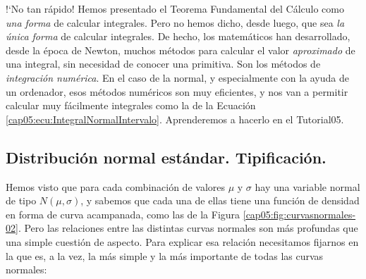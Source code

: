 {!`}No tan rápido! Hemos presentado el Teorema Fundamental del Cálculo como {\em una forma} de calcular integrales. Pero no hemos dicho, desde luego, que sea {\em la única forma} de calcular integrales. De hecho, los matemáticos han desarrollado, desde la época de Newton, muchos métodos para calcular el valor {\em aproximado} de una integral, sin necesidad de conocer una primitiva. Son los métodos de {\em integración numérica}. En el caso de la normal, y especialmente con la  ayuda de un ordenador, esos métodos numéricos son muy eficientes, y nos van a permitir calcular muy fácilmente integrales como la de la Ecuación \ref{cap05:ecu:IntegralNormalIntervalo}. Aprenderemos a hacerlo en el Tutorial05.


\subsection{Distribución normal estándar. Tipificación.}
\label{cap05:subsec:DistribucionNormalEstandarTipificacion}

Hemos visto que para cada combinación de valores $\mu$ y $\sigma$ hay una variable normal de tipo
$N(\mu,\sigma)$, y sabemos que cada una de ellas tiene una función de densidad en forma de curva
acampanada, como las de la Figura \ref{cap05:fig:curvasnormales-02}. Pero las relaciones entre las
distintas curvas normales son más profundas que una simple cuestión de aspecto. Para explicar esa
relación necesitamos fijarnos en la que es, a la vez, la más simple y la más importante de todas
las curvas normales:

    \begin{center}
    \end{center}

